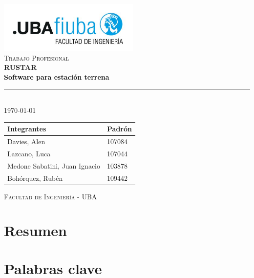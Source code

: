 \documentclass[a4paper,11pt]{article}
\begin{document}
\begin{titlepage}
\begin{center}

\includegraphics[width=7cm]{fiuba_logo.jpg} \\[2cm]

\textsc{\Large Trabajo Profesional} \\[0.5cm]
{\huge \bfseries RUSTAR \\[0.3cm]
Software para estación terrena} \\[1cm]

\rule{\linewidth}{0.4pt} \\[1cm]

{\large \today} \\[2cm]

\hspace*{-1.5cm}
\begin{tabular}{ | l | l | }
  \hline
  \textbf{Integrantes} & \textbf{Padrón} \\ \hline
  Davies, Alen & 107084 \\ \hline
  Lazcano, Luca & 107044 \\ \hline
  Medone Sabatini, Juan Ignacio & 103878 \\ \hline
  Bohórquez, Rubén & 109442 \\ \hline
\end{tabular}

\vfill

\textsc{Facultad de Ingeniería - UBA}

\end{center}
\end{titlepage}

\tableofcontents
\newpage

\section{Resumen}

\newpage

\section{Palabras clave}

\newpage
\end{document}
